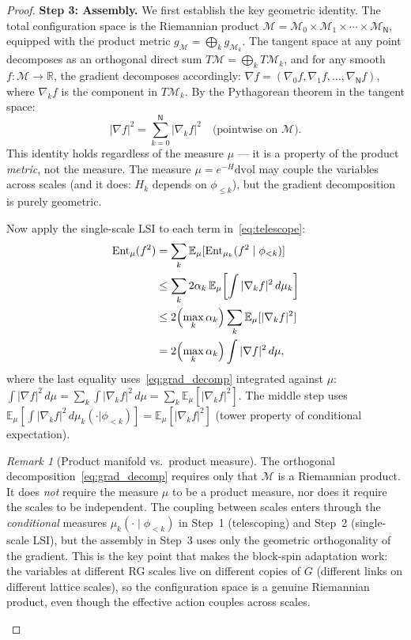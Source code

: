 \documentclass[11pt,a4paper]{article}
\theoremstyle{plain}
\theoremstyle{definition}
\theoremstyle{remark}
\newtheorem{remark}[theorem]{Remark}
\newcommand{\R}{\mathbb{R}}
\newcommand{\E}{\mathbb{E}}
\newcommand{\Ent}{\operatorname{Ent}}
\newcommand{\cM}{\mathcal{M}}
\begin{document}
\begin{proof}
\medskip\noindent
\textbf{Step 3: Assembly.}
We first establish the key geometric identity.
The total configuration space is the Riemannian
product $\cM = \cM_0 \times \cM_1 \times \cdots
\times \cM_{\mathsf{N}}$, equipped with the product metric
$g_\cM = \bigoplus_k g_{\cM_k}$. The tangent space
at any point decomposes as an orthogonal direct sum
$T\cM = \bigoplus_k T\cM_k$, and for any smooth
$f : \cM \to \R$, the gradient decomposes accordingly:
$\nabla f = (\nabla_0 f, \nabla_1 f, \ldots,
\nabla_{\mathsf{N}} f)$, where $\nabla_k f$ is the
component in $T\cM_k$. By the Pythagorean theorem
in the tangent space:
\begin{equation}\label{eq:grad_decomp}
  |\nabla f|^2 = \sum_{k=0}^{\mathsf{N}} |\nabla_k f|^2
  \quad\text{(pointwise on $\cM$)}.
\end{equation}
This identity holds regardless of the measure $\mu$
--- it is a property of the product \emph{metric},
not the measure. The measure $\mu = e^{-H}\mathrm{dvol}$
may couple the variables across scales (and it does:
$H_k$ depends on $\phi_{\le k}$), but the gradient
decomposition is purely geometric.

Now apply the single-scale LSI to each term
in~\eqref{eq:telescope}:
\begin{align}
  \Ent_\mu(f^2)
  &= \sum_k \E_\mu[\Ent_{\mu_k}(f^2\mid\phi_{<k})]
  \nonumber\\
  &\le \sum_k 2\alpha_k\,
  \E_\mu\!\left[\int |\nabla_k f|^2\,d\mu_k\right]
  \nonumber\\
  &\le 2\Bigl(\max_k \alpha_k\Bigr)
  \sum_k \E_\mu[|\nabla_k f|^2]
  \label{eq:bbd_assembly}\\
  &= 2\Bigl(\max_k \alpha_k\Bigr)
  \int |\nabla f|^2\,d\mu, \nonumber
\end{align}
where the last equality uses~\eqref{eq:grad_decomp}
integrated against $\mu$:
$\int|\nabla f|^2\,d\mu = \sum_k\int|\nabla_k f|^2
\,d\mu = \sum_k \E_\mu[|\nabla_k f|^2]$.
The middle step uses $\E_\mu[\int|\nabla_k f|^2
\,d\mu_k(\cdot|\phi_{<k})]
= \E_\mu[|\nabla_k f|^2]$ (tower property of
conditional expectation).

\begin{remark}[Product manifold vs.\ product measure]
\label{rem:product}
The orthogonal decomposition~\eqref{eq:grad_decomp}
requires only that $\cM$ is a Riemannian product.
It does \emph{not} require the measure $\mu$ to be
a product measure, nor does it require the scales
to be independent. The coupling between scales enters
through the \emph{conditional} measures $\mu_k(\cdot
\mid\phi_{<k})$ in Step~1 (telescoping) and Step~2
(single-scale LSI), but the assembly in Step~3 uses
only the geometric orthogonality of the gradient.
This is the key point that makes the block-spin
adaptation work: the variables at different RG
scales live on different copies of $G$ (different
links on different lattice scales), so the
configuration space is a genuine Riemannian product,
even though the effective action couples across scales.
\end{remark}


\end{proof}
\end{document}
